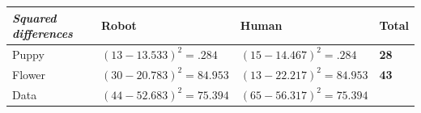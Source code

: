 \documentclass[
]{book}
\begin{document}
\begin{longtable}[]{@{}llll@{}}
\toprule
\begin{minipage}[b]{0.24\columnwidth}\raggedright
\emph{Squared differences}\strut
\end{minipage} & \begin{minipage}[b]{0.27\columnwidth}\raggedright
Robot\strut
\end{minipage} & \begin{minipage}[b]{0.27\columnwidth}\raggedright
Human\strut
\end{minipage} & \begin{minipage}[b]{0.10\columnwidth}\raggedright
Total\strut
\end{minipage}\tabularnewline
\midrule
\endhead
\begin{minipage}[t]{0.24\columnwidth}\raggedright
Puppy\strut
\end{minipage} & \begin{minipage}[t]{0.27\columnwidth}\raggedright
\((13-13.533)^2 = .284\)\strut
\end{minipage} & \begin{minipage}[t]{0.27\columnwidth}\raggedright
\((15-14.467)^2 = .284\)\strut
\end{minipage} & \begin{minipage}[t]{0.10\columnwidth}\raggedright
\textbf{28}\strut
\end{minipage}\tabularnewline
\begin{minipage}[t]{0.24\columnwidth}\raggedright
Flower\strut
\end{minipage} & \begin{minipage}[t]{0.27\columnwidth}\raggedright
\((30-20.783)^2 = 84.953\)\strut
\end{minipage} & \begin{minipage}[t]{0.27\columnwidth}\raggedright
\((13-22.217)^2 = 84.953\)\strut
\end{minipage} & \begin{minipage}[t]{0.10\columnwidth}\raggedright
\textbf{43}\strut
\end{minipage}\tabularnewline
\begin{minipage}[t]{0.24\columnwidth}\raggedright
Data\strut
\end{minipage} & \begin{minipage}[t]{0.27\columnwidth}\raggedright
\((44-52.683)^2 = 75.394\)\strut
\end{minipage} & \begin{minipage}[t]{0.27\columnwidth}\raggedright
\((65-56.317)^2 = 75.394\)\strut

\end{minipage}
\end{longtable}
\end{document}
